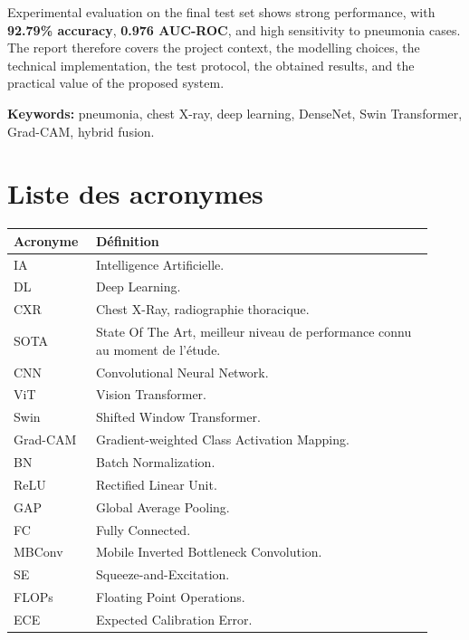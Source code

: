 \documentclass[a4paper,11pt,oneside]{report}
\begin{document}
Experimental evaluation on the final test set shows strong performance, with \textbf{92.79\% accuracy}, \textbf{0.976 AUC-ROC}, and high sensitivity to pneumonia cases. The report therefore covers the project context, the modelling choices, the technical implementation, the test protocol, the obtained results, and the practical value of the proposed system.

\vspace{0.35cm}
\noindent\textbf{Keywords:} pneumonia, chest X-ray, deep learning, DenseNet, Swin Transformer, Grad-CAM, hybrid fusion.

\chapter*{Liste des acronymes}
\renewcommand{\arraystretch}{1.15}
\begin{center}
\begin{tabular}{p{0.17\linewidth} p{0.75\linewidth}}
\toprule
\textbf{Acronyme} & \textbf{Définition} \\
\midrule
IA & Intelligence Artificielle. \\
DL & Deep Learning. \\
CXR & Chest X-Ray, radiographie thoracique. \\
SOTA & State Of The Art, meilleur niveau de performance connu au moment de l'étude. \\
CNN & Convolutional Neural Network. \\
ViT & Vision Transformer. \\
Swin & Shifted Window Transformer. \\
Grad-CAM & Gradient-weighted Class Activation Mapping. \\
BN & Batch Normalization. \\
ReLU & Rectified Linear Unit. \\
GAP & Global Average Pooling. \\
FC & Fully Connected. \\
MBConv & Mobile Inverted Bottleneck Convolution. \\
SE & Squeeze-and-Excitation. \\
FLOPs & Floating Point Operations. \\
ECE & Expected Calibration Error. \\
\bottomrule
\end{tabular}
\end{center}

\clearpage
{}
\end{document}
